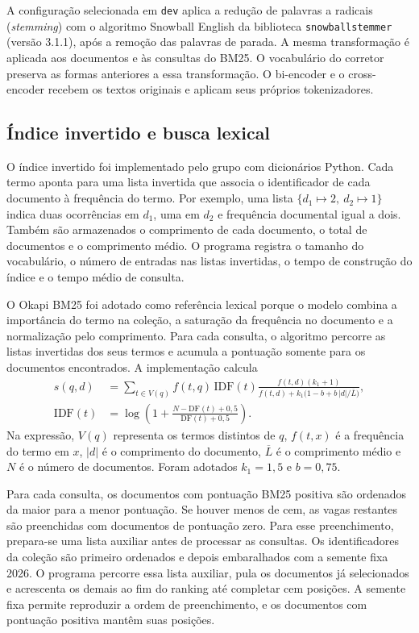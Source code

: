 \documentclass[12pt]{article}
\begin{document}
A configuração selecionada em \texttt{dev} aplica a redução de palavras a
radicais (\textit{stemming}) com o algoritmo Snowball English da biblioteca
\texttt{snowballstemmer} (versão 3.1.1), após a remoção das palavras de parada. A mesma transformação é aplicada aos
documentos e às consultas do BM25. O vocabulário do corretor preserva as
formas anteriores a essa transformação. O bi-encoder e o cross-encoder
recebem os textos originais e aplicam seus próprios tokenizadores.

\subsection{Índice invertido e busca lexical}

O índice invertido foi implementado pelo grupo com dicionários Python. Cada
termo aponta para uma lista invertida que associa o identificador de cada
documento à frequência do termo. Por exemplo, uma lista
\(\{d_1 \mapsto 2,\ d_2 \mapsto 1\}\) indica duas ocorrências em \(d_1\),
uma em \(d_2\) e frequência documental igual a dois. Também são armazenados o
comprimento de cada documento, o total de documentos e o comprimento médio.
O programa registra o tamanho do vocabulário, o número de entradas nas listas
invertidas, o tempo de construção do índice e o tempo médio de consulta.

O Okapi BM25 \cite{manning2008} foi adotado como referência lexical porque o
modelo combina a importância do termo na coleção, a saturação da frequência
no documento e a normalização pelo comprimento. Para cada consulta, o
algoritmo percorre as listas invertidas dos seus termos e acumula a pontuação
somente para os documentos encontrados. A implementação calcula
\begin{align*}
  s(q,d) &=
  \sum_{t\in V(q)}
  f(t,q)\,\mathrm{IDF}(t)
  \frac{f(t,d)(k_1+1)}
  {f(t,d)+k_1\bigl(1-b+b\,|d|/\overline{L}\bigr)}, \\
  \mathrm{IDF}(t) &=
    \log\!\left(1+\frac{N-\mathrm{DF}(t)+0{,}5}
                       {\mathrm{DF}(t)+0{,}5}\right).
\end{align*}
Na expressão, \(V(q)\) representa os termos distintos de \(q\), \(f(t,x)\) é a
frequência do termo em \(x\), \(|d|\) é o comprimento do documento,
\(\overline{L}\) é o comprimento médio e \(N\) é o número de documentos.
Foram adotados \(k_1=1{,}5\) e \(b=0{,}75\).

Para cada consulta, os documentos com pontuação BM25 positiva são ordenados
da maior para a menor pontuação. Se houver menos de cem, as vagas restantes
são preenchidas com documentos de pontuação zero. Para esse preenchimento,
prepara-se uma lista auxiliar antes de processar as consultas. Os identificadores
da coleção são primeiro ordenados e depois embaralhados com a semente fixa
2026. O programa percorre essa lista auxiliar, pula os documentos já
selecionados e acrescenta os demais ao fim do ranking até completar cem
posições. A semente fixa permite reproduzir a ordem de preenchimento, e
os documentos com pontuação positiva mantêm suas posições.
\end{document}
